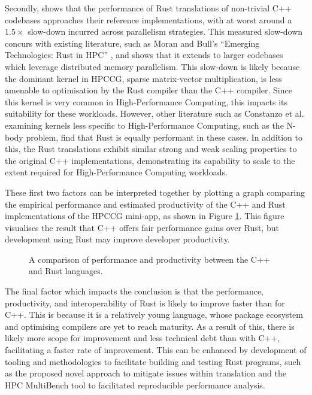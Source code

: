 Secondly,  shows that the performance of Rust translations of non-trivial C++ codebases approaches their reference implementations, with at worst around a $1.5 \times$ slow-down incurred across parallelism strategies. This measured slow-down concurs with existing literature, such as Moran and Bull's ``Emerging Technologies: Rust in HPC'' \cite{moranEmergingTechnologiesRust2023}, and shows that it extends to larger codebases which leverage distributed memory parallelism. This slow-down is likely because the dominant kernel in HPCCG, sparse matrix-vector multiplication, is less amenable to optimisation by the Rust compiler than the C++ compiler. Since this kernel is very common in High-Performance Computing, this impacts its suitability for these workloads. However, other literature such as Constanzo et al. \cite{costanzoPerformanceVsProgramming2021} examining kernels less specific to High-Performance Computing, such as the N-body problem, find that Rust is equally performant in these cases. In addition to this, the Rust translations exhibit similar strong and weak scaling properties to the original C++ implementations, demonstrating its capability to scale to the extent required for High-Performance Computing workloads.

These first two factors can be interpreted together by plotting a graph comparing the empirical performance and estimated productivity of the C++ and Rust implementations of the HPCCG mini-app, as shown in Figure \ref{fig:conclusions_performance_productivity}. This figure visualises the result that C++ offers fair performance gains over Rust, but development using Rust may improve developer productivity.

\begin{figure}[H]
    \centering
    
    \caption{A comparison of performance and productivity between the C++ and Rust languages.}
    \label{fig:conclusions_performance_productivity}
\end{figure}

The final factor which impacts the conclusion is that the performance, productivity, and interoperability of Rust is likely to improve faster than for C++. This is because it is a relatively young language, whose package ecosystem and optimising compilers are yet to reach maturity. As a result of this, there is likely more scope for improvement and less technical debt than with C++, facilitating a faster rate of improvement.
This can be enhanced by development of tooling and methodologies to facilitate building and testing Rust programs, such as the proposed novel approach to mitigate issues within translation and the HPC MultiBench tool to facilitated reproducible performance analysis.


